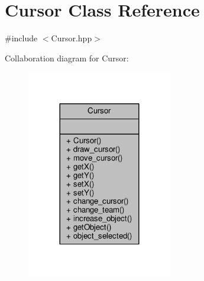 \hypertarget{class_cursor}{}\section{Cursor Class Reference}
\label{class_cursor}


{\ttfamily \#include $<$Cursor.\+hpp$>$}



Collaboration diagram for Cursor\+:\nopagebreak
\begin{figure}[H]
\begin{center}
\leavevmode
\includegraphics[width=180pt]{class_cursor__coll__graph}
\end{center}
\end{figure}

